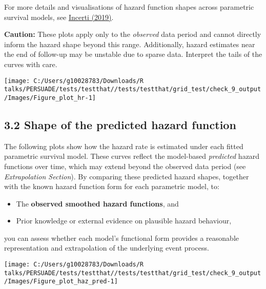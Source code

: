 \documentclass[
]{article}
\providecommand{\tightlist}{%
  \setlength{\itemsep}{0pt}\setlength{\parskip}{0pt}}
\begin{document}
For more details and visualisations of hazard function shapes across
parametric survival models, see
\href{https://devinincerti.com/2019/06/18/parametric_survival.html}{Incerti
(2019)}.

\textbf{Caution:} These plots apply only to the \emph{observed} data
period and cannot directly inform the hazard shape beyond this range.
Additionally, hazard estimates near the end of follow-up may be unstable
due to sparse data. Interpret the tails of the curves with care.

\clearpage

\begin{flushleft}\texttt{[image: C:/Users/g10028783/Downloads/R talks/PERSUADE/tests/testthat//tests/testthat/grid\_test/check\_9\_output/Images/Figure\_plot\_hr-1]} \end{flushleft}

\clearpage

\subsection{3.2 Shape of the predicted hazard
function}\label{shape-of-the-predicted-hazard-function}

The following plots show how the hazard rate is estimated under each
fitted parametric survival model. These curves reflect the model-based
\emph{predicted} hazard functions over time, which may extend beyond the
observed data period (see \emph{Extrapolation Section}). By comparing
these predicted hazard shapes, together with the known hazard function
form for each parametric model, to:

\begin{itemize}
\tightlist
\item
  The \textbf{observed smoothed hazard functions}, and\\
\item
  Prior knowledge or external evidence on plausible hazard behaviour,
\end{itemize}

you can assess whether each model's functional form provides a
reasonable representation and extrapolation of the underlying event
process.

\clearpage

\begin{flushleft}\texttt{[image: C:/Users/g10028783/Downloads/R talks/PERSUADE/tests/testthat//tests/testthat/grid\_test/check\_9\_output/Images/Figure\_plot\_haz\_pred-1]} \end{flushleft}
\end{document}
